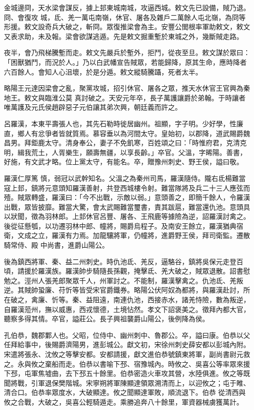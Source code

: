\begin{pinyinscope}
 金城邊冏，天水梁會謀反，據上邽東城南城，攻逼西城。敕文先已設備，賊乃退。冏、會復攻
 城，氐、羌一萬屯南嶺，休官、屠各及雜戶二萬餘人屯北嶺，為冏等形援。敕文設奇兵大破之，斬冏。眾復推梁會為主。安豐公閭根率軍助敕文，敕文又表求助，未及報。梁會欲謀逃遁。先是敕文掘重塹於東城之外，幾斷賊走路。



 夜半，會乃飛梯騰塹而走。敕文先嚴兵於塹外，拒鬥，從夜至旦。敕文謀於眾曰：「困獸猶鬥，而況於人。」乃以白武幡宣告賊眾，若能歸降，原其生命，應時降者六百餘人。會知人心沮壞，於是分遁。敕文縱騎騰躡，死者太半。



 略陽王元達因梁會之亂，聚黨攻城，招引休官、屠各之眾，推天水休官王官興為秦地王。敕文與臨淮公莫
 真討破之。天安元年卒，長子萬護讓爵於弟翰。于時讓者唯萬護及元氏侯趙辟惡子元伯讓其弟次興，朝廷義而許之。



 呂羅漢，本東平壽張人也，其先石勒時徙居幽州。祖顯，字子明。少好學，性廉直，鄉人有忿爭者皆就質焉。慕容垂以為河間太守。皇始初，以郡降，道武賜爵魏昌男。拜鉅鹿太守。清身奉公，妻子不免飢寒，百姓頌之曰：「時惟府君，克清克明，緝我荒土，人胥樂生，願壽無疆，以享長齡。」卒官。父溫，字晞陽。善書，好施，有文武才略。位上黨太守，有能名。卒，贈豫州刺史、野王侯，謚曰敬。



 羅漢仁厚篤
 慎，弱冠以武幹知名。父溫之為秦州司馬，羅漢隨侍。隴右氐楊難當寇上邽，鎮將元意頭知羅漢善射，共登西城樓令射。難當隊將及兵二十三人應弦而殪。賊眾轉盛，羅漢曰：「今不出戰，示敵以弱。」意頭善之，即簡千餘人，令羅漢出戰，眾皆披靡。難當大驚，會太武賜難當璽書，責其跋扈，難當還仇池。意頭具以狀聞，徵為羽林郎。上邽休官呂豐、屠各、王飛鹿等據險為逆，詔羅漢討禽之。後從征懸瓠，以功遷羽林中郎、幢將，賜爵烏程子。及南安王餘立，羅漢猶典宿衛，文成之立，羅漢有力焉。加龍驤將軍，仍幢將，進爵野王侯，拜司衛監。遷散騎常侍、殿
 中尚書，進爵山陽公。



 後為鎮西將軍、秦、益二州刺史。時仇池氐、羌反，逼駱谷，鎮將吳保元走登百頃，請援於羅漢族。羅漢帥步騎隨長孫觀，掩擊氐、羌大破之，賊眾退散。詔書慰勉之。涇州人張羌郎聚眾千人，州軍討之。不能制，羅漢擊禽之。仇池氐、羌叛逆。其賊帥蛩廉、苻忻等皆受宋官爵鐵券。略陽公伏阿奴為都將，與羅漢赴討，所在破之，禽廉、忻等。秦、益阻遠，南連仇池，西接赤水，諸羌恃險，數為叛逆，自羅漢蒞州，撫以威惠，西戎懷德，土境怗然。孝文下詔褒美之。徵拜內都大官，聽察多得其情。卒官，謚莊公。長子興祖襲爵山陽公，後例降為侯。



 孔伯恭，魏郡鄴人也。父昭，位侍中、幽州刺中、魯郡公。卒，謚曰康。伯恭以父任拜給事中，後賜爵濟陽男，進彭城公。獻文初，宋徐州刺史薛安都以彭城內附。宋遣將張永、沈攸之等擊安都。安都請援，獻文進伯恭號鎮東將軍，副尚書尉元救之。永與攸之棄船而走。伯恭以書喻下邳、宿豫城內。時攸之、吳喜公等率眾來援下邳，屯軍焦墟曲，去下邳五十餘里。伯恭密造火車攻其營，水陸俱進。攸之等既聞將戰，引軍退保樊階城。宋寧朔將軍陳顯達領眾溯清而上，以迎攸之；屯于睢、清合口。伯恭率眾度水，大破顯達。攸之聞顯達軍敗，順流退下。伯恭
 從清西與攸之合戰，大破之，吳喜公輕騎遁走。乘勝追奔八十餘里，軍資器械虜獲萬計。




\end{pinyinscope}

